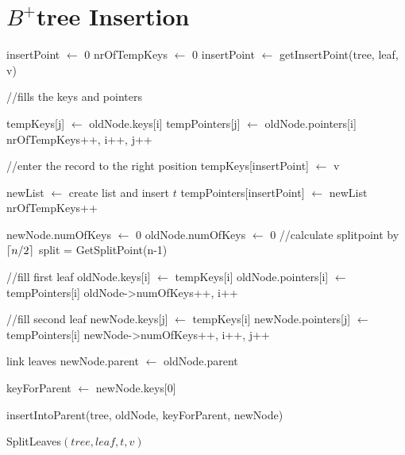 \documentclass[abstracton,12pt,oneside]{scrreprt}
\DeclarePairedDelimiter\ceil{\lceil}{\rceil}
\begin{document}
\section{$B^+$tree Insertion}
\label{app:insertion}
\begin{algorithm}[H]
	\IncMargin{1em}
	\SetAlgoLined
	\DontPrintSemicolon
	
	
	
	insertPoint $\leftarrow$ 0\;
	nrOfTempKeys $\leftarrow$ 0\;
	insertPoint $\leftarrow$ getInsertPoint(tree, leaf, v)\;
	
	//fills the keys and pointers\;
	 {
		
		tempKeys[j] $\leftarrow$ oldNode.keys[i]\;
		tempPointers[j] $\leftarrow$ oldNode.pointers[i]\;
		nrOfTempKeys++, i++, j++\;
	}
	
	//enter the record to the right position\;
	tempKeys[insertPoint] $\leftarrow$ v\;
	
	newList $\leftarrow$ create list and insert $t$\;
	tempPointers[insertPoint] $\leftarrow$ newList\;
	nrOfTempKeys++\;
	
	newNode.numOfKeys $\leftarrow$ 0\;
	oldNode.numOfKeys $\leftarrow$ 0\;
	\BlankLine
	//calculate splitpoint by $\ceil{n/2}$\;
	split = GetSplitPoint(n-1)\;
	
	//fill first leaf\;
	 {
		oldNode.keys[i] $\leftarrow$ tempKeys[i]\;
		oldNode.pointers[i] $\leftarrow$ tempPointers[i]\;
		oldNode->numOfKeys++, i++\;
	}
	
	
	//fill second leaf\;
	 {
		newNode.keys[j] $\leftarrow$ tempKeys[i]\;
		newNode.pointers[j] $\leftarrow$ tempPointers[i]\;
		newNode->numOfKeys++, i++, j++\;
	}
	
	link leaves\;
	newNode.parent $\leftarrow$ oldNode.parent\;
	
	keyForParent $\leftarrow$ newNode.keys[0]\;
	
	insertIntoParent(tree, oldNode, keyForParent, newNode)\;
	
	
	
	
	\caption{SplitLeaves$(tree, leaf, t, v)$}	\label{SplitLeaves}
\end{algorithm}
\end{document}
